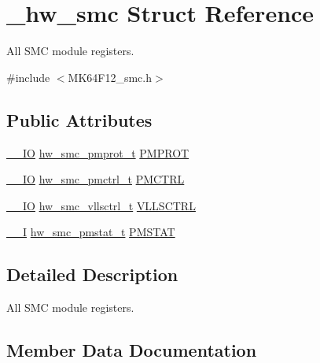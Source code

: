 \hypertarget{struct__hw__smc}{}\section{\+\_\+hw\+\_\+smc Struct Reference}
\label{struct__hw__smc}


All S\+MC module registers.  




{\ttfamily \#include $<$M\+K64\+F12\+\_\+smc.\+h$>$}

\subsection*{Public Attributes}
\begin{DoxyCompactItemize}
\item 
\hyperlink{core__sc300_8h_aec43007d9998a0a0e01faede4133d6be}{\+\_\+\+\_\+\+IO} \hyperlink{union__hw__smc__pmprot}{hw\+\_\+smc\+\_\+pmprot\+\_\+t} \hyperlink{struct__hw__smc_aed2e076c47d58654e18030aeb33a8787}{P\+M\+P\+R\+OT}
\item 
\hyperlink{core__sc300_8h_aec43007d9998a0a0e01faede4133d6be}{\+\_\+\+\_\+\+IO} \hyperlink{union__hw__smc__pmctrl}{hw\+\_\+smc\+\_\+pmctrl\+\_\+t} \hyperlink{struct__hw__smc_ab8716e4edafb265314978c3aa5387fc3}{P\+M\+C\+T\+RL}
\item 
\hyperlink{core__sc300_8h_aec43007d9998a0a0e01faede4133d6be}{\+\_\+\+\_\+\+IO} \hyperlink{union__hw__smc__vllsctrl}{hw\+\_\+smc\+\_\+vllsctrl\+\_\+t} \hyperlink{struct__hw__smc_ad94d9a89e7ad02829de04774bb93b96c}{V\+L\+L\+S\+C\+T\+RL}
\item 
\hyperlink{core__sc300_8h_af63697ed9952cc71e1225efe205f6cd3}{\+\_\+\+\_\+I} \hyperlink{union__hw__smc__pmstat}{hw\+\_\+smc\+\_\+pmstat\+\_\+t} \hyperlink{struct__hw__smc_a1bff3e9303d6c0a5205e007a1e386860}{P\+M\+S\+T\+AT}
\end{DoxyCompactItemize}


\subsection{Detailed Description}
All S\+MC module registers. 

\subsection{Member Data Documentation}
